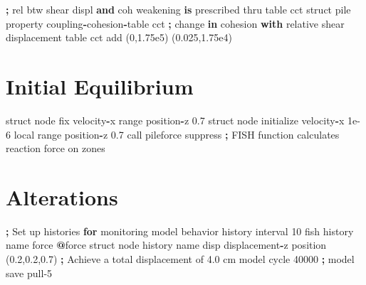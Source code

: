 \documentclass[a4paper, nobind]{templates/ociamthesis}
\newenvironment{Shaded}{\begin{snugshade}}{\end{snugshade}}
\newcommand{\BuiltInTok}[1]{#1}
\newcommand{\ControlFlowTok}[1]{\textcolor[rgb]{0.13,0.29,0.53}{\textbf{#1}}}
\newcommand{\DecValTok}[1]{\textcolor[rgb]{0.00,0.00,0.81}{#1}}
\newcommand{\FloatTok}[1]{\textcolor[rgb]{0.00,0.00,0.81}{#1}}
\newcommand{\KeywordTok}[1]{\textcolor[rgb]{0.13,0.29,0.53}{\textbf{#1}}}
\newcommand{\NormalTok}[1]{#1}
\newcommand{\OperatorTok}[1]{\textcolor[rgb]{0.81,0.36,0.00}{\textbf{#1}}}
\newcommand{\StringTok}[1]{\textcolor[rgb]{0.31,0.60,0.02}{#1}}
\renewenvironment{Shaded}
{
  \vspace{10pt}%
  \begin{snugshade}%
}{%
  \end{snugshade}%
  \vspace{8pt}%
}
\begin{document}
\begin{Shaded}
\begin{Highlighting}[]
\OperatorTok{;}\NormalTok{ rel btw shear displ }\KeywordTok{and}\NormalTok{ coh weakening }\KeywordTok{is}\NormalTok{ prescribed thru table cct}
\NormalTok{struct pile }\BuiltInTok{property}\NormalTok{ coupling}\OperatorTok{{-}}\NormalTok{cohesion}\OperatorTok{{-}}\NormalTok{table }\StringTok{\textquotesingle{}cct\textquotesingle{}}
\OperatorTok{;}\NormalTok{ change }\KeywordTok{in}\NormalTok{ cohesion }\ControlFlowTok{with}\NormalTok{ relative shear displacement}
\NormalTok{table }\StringTok{\textquotesingle{}cct\textquotesingle{}}\NormalTok{ add (}\DecValTok{0}\NormalTok{,}\FloatTok{1.75e5}\NormalTok{) (}\FloatTok{0.025}\NormalTok{,}\FloatTok{1.75e4}\NormalTok{)}
\end{Highlighting}
\end{Shaded}

\hypertarget{initial-equilibrium-2}{%
\section{Initial Equilibrium}\label{initial-equilibrium-2}}

\begin{Shaded}
\begin{Highlighting}[]
\NormalTok{struct node fix velocity}\OperatorTok{{-}}\NormalTok{x }\BuiltInTok{range}\NormalTok{ position}\OperatorTok{{-}}\NormalTok{z }\FloatTok{0.7}
\NormalTok{struct node initialize velocity}\OperatorTok{{-}}\NormalTok{x }\FloatTok{1e{-}6}\NormalTok{ local }\BuiltInTok{range}\NormalTok{ position}\OperatorTok{{-}}\NormalTok{z }\FloatTok{0.7}
\NormalTok{call }\StringTok{\textquotesingle{}pileforce\textquotesingle{}}\NormalTok{ suppress }\OperatorTok{;}\NormalTok{ FISH function calculates reaction force on zones}
\end{Highlighting}
\end{Shaded}

\hypertarget{alterations-2}{%
\section{Alterations}\label{alterations-2}}

\begin{Shaded}
\begin{Highlighting}[]
\OperatorTok{;}\NormalTok{ Set up histories }\ControlFlowTok{for}\NormalTok{ monitoring model behavior}
\NormalTok{history interval }\DecValTok{10}
\NormalTok{fish history name }\StringTok{\textquotesingle{}force\textquotesingle{}} \OperatorTok{@}\NormalTok{force}
\NormalTok{struct node history name }\StringTok{\textquotesingle{}disp\textquotesingle{}}\NormalTok{ displacement}\OperatorTok{{-}}\NormalTok{z position (}\FloatTok{0.2}\NormalTok{,}\FloatTok{0.2}\NormalTok{,}\FloatTok{0.7}\NormalTok{)}
\OperatorTok{;}\NormalTok{ Achieve a total displacement of }\FloatTok{4.0}\NormalTok{ cm}
\NormalTok{model cycle }\DecValTok{40000}
\OperatorTok{;}
\NormalTok{model save }\StringTok{\textquotesingle{}pull{-}5\textquotesingle{}}
\end{Highlighting}
\end{Shaded}
\end{document}
